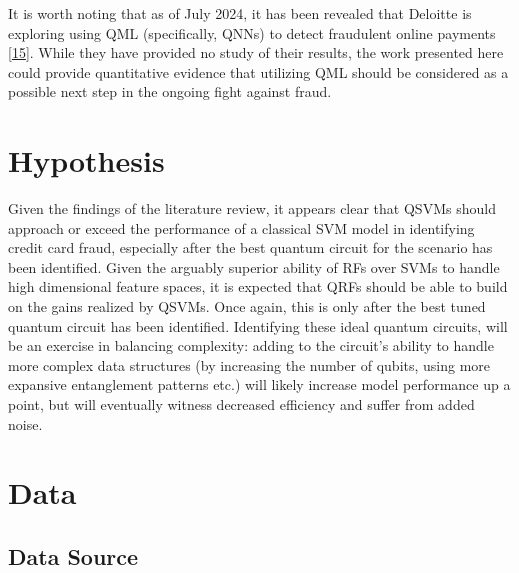 \documentclass[11pt, oneside]{article}   	%
\begin{document}
\noindent\hspace{10mm}It is worth noting that as of July 2024, it has been revealed that Deloitte is exploring using QML (specifically, QNNs) to detect fraudulent online payments [\href{https://thequantuminsider.com/2024/07/19/deloitte-italy-explores-quantum-machine-learning-for-digital-payments-fraud-detection/}{15}]. While they have provided no study of their results, the work presented here could provide quantitative evidence that utilizing QML should be considered as a possible next step in the ongoing fight against fraud. 




\section{Hypothesis}

Given the findings of the literature review, it appears clear that QSVMs should approach or exceed the performance of a classical SVM model in identifying credit card fraud, especially after the best quantum circuit for the scenario has been identified. Given the arguably superior ability of RFs over SVMs to handle high dimensional feature spaces, it is expected that QRFs should be able to build on the gains realized by QSVMs. Once again, this is only after the best tuned quantum circuit has been identified. Identifying these ideal quantum circuits, will be an exercise in balancing complexity: adding to the circuit's ability to handle more complex data structures (by increasing the number of qubits, using more expansive entanglement patterns etc.) will likely increase model performance up a point, but will eventually witness decreased efficiency and suffer from added noise. 




\section{Data}
\subsection{Data Source}
\end{document}

